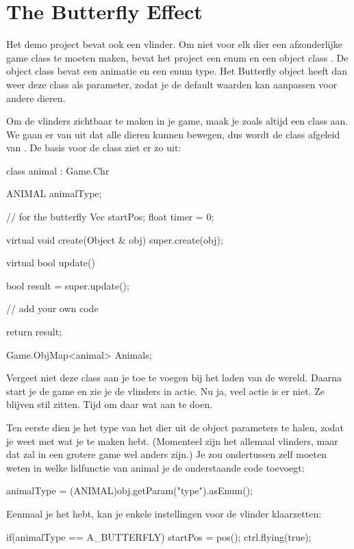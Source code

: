 \section{The Butterfly Effect}
Het demo project bevat ook een vlinder. Om niet voor elk dier een afzonderlijke game class te moeten maken, bevat het project een enum  en een object class . De object class bevat een animatie en een enum type. Het Butterfly object heeft dan weer deze class als parameter, zodat je de default waarden kan aanpassen voor andere dieren.

Om de vlinders zichtbaar te maken in je game, maak je zoals altijd een class aan. We gaan er van uit dat alle dieren kunnen bewegen, dus wordt de class afgeleid van . De basis voor de class ziet er zo uit:

\begin{code}
class animal : Game.Chr
{
	ANIMAL animalType;

	// for the butterfly
	Vec startPos;
	float timer = 0;

	virtual void create(Object & obj) {
		super.create(obj);
	}

	virtual bool update() {
		bool result = super.update();

		// add your own code

		return result;
	}
}
Game.ObjMap<animal> Animals;
\end{code}

Vergeet niet deze class aan je  toe te voegen bij het laden van de wereld. Daarna start je de game en zie je de vlinders in actie. Nu ja, veel actie is er niet. Ze blijven stil zitten. Tijd om daar wat aan te doen.

Ten eerste dien je het type van het dier uit de object parameters te halen, zodat je weet met wat je te maken hebt. (Momenteel zijn het allemaal vlinders, maar dat zal in een grotere game wel anders zijn.) Je zou ondertussen zelf moeten weten in welke lidfunctie van animal je de onderstaande code toevoegt:

\begin{code}
animalType = (ANIMAL)obj.getParam("type").asEnum();
\end{code}

Eenmaal je het  hebt, kan je enkele instellingen voor de vlinder klaarzetten:

\begin{code}
if(animalType == A_BUTTERFLY)
{
 	startPos = pos();
 	ctrl.flying(true);
}
\end{code}

